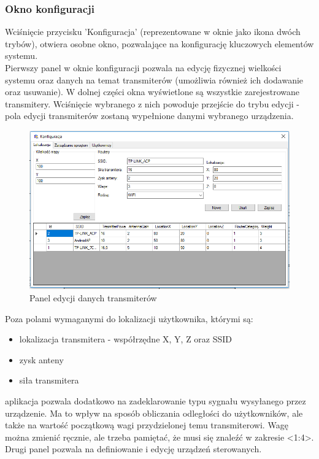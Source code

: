 \subsubsection{Okno konfiguracji}
Wciśnięcie przycisku 'Konfiguracja' (reprezentowane w oknie jako ikona dwóch trybów), otwiera osobne okno, pozwalające na konfigurację kluczowych elementów systemu.\\
Pierwszy panel w oknie konfiguracji pozwala na edycję fizycznej wielkości systemu oraz danych na temat transmiterów (umożliwia również ich dodawanie oraz usuwanie).
W dolnej części okna wyświetlone są wszystkie zarejestrowane transmitery. Wciśnięcie wybranego z nich powoduje przejście do trybu edycji - pola edycji transmiterów zostaną wypełnione danymi wybranego urządzenia.
\begin{figure}[H]			
	\centering
	\caption{Panel edycji danych transmiterów}
	\includegraphics[width=1.0\textwidth]{panel_konf_router}
\end{figure}
Poza polami wymaganymi do lokalizacji użytkownika, którymi są:
\begin{itemize}
	\item lokalizacja transmitera - współrzędne X, Y, Z oraz SSID
	\item zysk anteny
	\item siła transmitera
\end{itemize}
aplikacja pozwala dodatkowo na zadeklarowanie typu sygnału wysyłanego przez urządzenie. Ma to wpływ na sposób obliczania odległości do użytkowników, ale także na wartość początkową wagi przydzielonej temu transmiterowi. Wagę można zmienić ręcznie, ale trzeba pamiętać, że musi się znaleźć w zakresie <1:4>.\\
Drugi panel pozwala na definiowanie i edycję urządzeń sterowanych.
